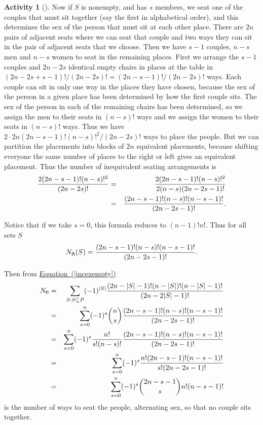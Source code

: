 \documentclass[10pt,]{book}
\theoremstyle{plain}
\theoremstyle{definition}
\newtheorem{activity}[project]{Activity}
\numberwithin{equation}{chapter}
\newcommand{\amp}{&}
\begin{document}
\begin{activity}[]
Now if \(S\) is nonempty, and has \(s\) members, we seat one of the couples that must sit together (say the first in alphabetical order), and this determines the sex of the person that must sit at each other place. There are \(2n\) pairs of adjacent seats where we can seat that couple and two ways they can sit in the pair of adjacent seats that we choose. Then we have \(s-1\) couples, \(n-s\) men and \(n-s\) women to seat in the remaining places. First we arrange the \(s-1\) couples and \(2n-2s\) identical empty chairs in places at the table in \((2n-2s+s-1)!/(2n-2s)!=(2n-s-1)!/(2n-2s)!\) ways. Each couple can sit in only one way in the places they have chosen, because the sex of the person in a given place has been determined by how the first couple sits. The sex of the person in each of the remaining chairs has been determined, so we assign the men to their seats in \((n-s)!\) ways and we assign the women to their seats in \((n-s)!\) ways. Thus we have \(2\cdot2n(2n-s-1)!(n-s)!^2/(2n-2s)!\) ways to place the people. But we can partition the placements into blocks of \(2n\) equivalent placements, because shifting everyone the same number of places to the right or left gives an equivalent placement. Thus the number of inequivalent seating arrangements is%
\begin{align*}
{2(2n-s-1)!(n-s)!^2\over(2n-2s)!}\amp =\amp {2(2n-s-1)!(n-s)!^2\over
2(n-s)(2n-2s-1)!}\\
\amp =\amp {(2n-s-1)!(n-s)!(n-s-1)!\over(2n-2s-1)!}.
\end{align*}
%
\par
Notice that if we take \(s=0\), this formula reduces to \((n-1)!n!\). Thus for all sets \(S\)%
\begin{equation*}
N_{\mbox{a} }(S)={(2n-s-1)!(n-s)!(n-s-1)!\over(2n-2s-1)!}.
\end{equation*}
%
\par
Then from \hyperref[incexempty]{Equation~(\ref{incexempty})}%
\begin{align*}
N_{\mbox{e} } \amp =\amp  \sum_{S:S\subseteq P} (-1)^{|S|}{(2n-|S|-1)!(n-|S|)!(n-|S|-1)!
\over(2n-2|S|-1)!}\\
\amp =\amp \sum_{s=0}^n(-1)^s{n\choose s}{(2n-s-1)!(n-s)!(n-s-1)!\over(2n-2s-1)!}\\
\amp =\amp \sum_{s=0}^n(-1)^s{n!\over
s!(n-s)!}{(2n-s-1)!(n-s)!(n-s-1)!\over(2n-2s-1)!}\\
\amp =\amp \sum_{s=0}^n(-1)^s {n!(2n-s-1)!(n-s-1)!\over s!(2n-2s-1)!}\\
\amp =\amp \sum_{s=0}^n(-1)^s{2n-s-1\choose s}n!(n-s-1)!
\end{align*}
is the number of ways to seat the people, alternating sex, so that no couple sits together.%
\end{activity}
\typeout{************************************************}
\typeout{************************************************}
\end{document}
